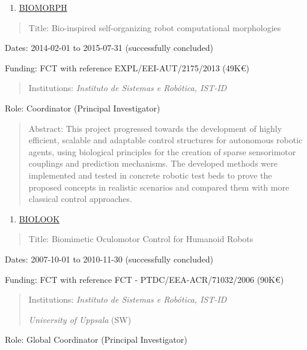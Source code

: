 \documentclass[
]{article}
\begin{document}
\begin{enumerate}
\def\labelenumi{\arabic{enumi}.}
\setcounter{enumi}{5}
\item
  \ul{BIOMORPH}
\end{enumerate}

\begin{quote}
Title: Bio-inspired self-organizing robot computational morphologies
\end{quote}

Dates: 2014-02-01 to 2015-07-31 (successfully concluded)

Funding: FCT with reference EXPL/EEI-AUT/2175/2013 (49K€)

\begin{quote}
Institutions: \emph{Instituto de Sistemas e Robótica, IST-ID}
\end{quote}

Role: Coordinator (Principal Investigator)

\begin{quote}
Abstract: This project progressed towards the development of highly
efficient, scalable and adaptable control structures for autonomous
robotic agents, using biological principles for the creation of sparse
sensorimotor couplings and prediction mechanisms. The developed methods
were implemented and tested in concrete robotic test beds to prove the
proposed concepts in realistic scenarios and compared them with more
classical control approaches.
\end{quote}

\begin{enumerate}
\def\labelenumi{\arabic{enumi}.}
\setcounter{enumi}{6}
\item
  \ul{BIOLOOK}
\end{enumerate}

\begin{quote}
Title: Biomimetic Oculomotor Control for Humanoid Robots
\end{quote}

Dates: 2007-10-01 to 2010-11-30 (successfully concluded)

Funding: FCT with reference FCT - PTDC/EEA-ACR/71032/2006 (90K€)

\begin{quote}
Institutions: \emph{Instituto de Sistemas e Robótica, IST-ID}

\emph{University of Uppsala} (SW)
\end{quote}

Role: Global Coordinator (Principal Investigator)
\end{document}
